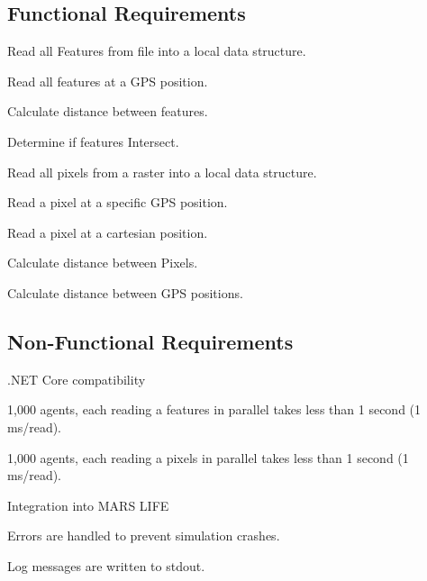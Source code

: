 \subsection{Functional Requirements}
\reqstartF
	\item Read all Features from file into a local data structure.
	\item Read all features at a GPS position.
	\item Calculate distance between features.
	\item Determine if features Intersect.
	\item Read all pixels from a raster into a local data structure.
	\item Read a pixel at a specific GPS position.
	\item Read a pixel at a cartesian position.
	\item Calculate distance between Pixels.
	\item Calculate distance between GPS positions.
\reqendF


\subsection{Non-Functional Requirements}
\reqstartNF
	\item .NET Core compatibility
	\item 1,000 agents, each reading a features in parallel takes less than 1 second (1 ms/read).
	\item 1,000 agents, each reading a pixels in parallel takes less than 1 second (1 ms/read).
	\item Integration into MARS LIFE
	\item Errors are handled to prevent simulation crashes.
	\item Log messages are written to stdout.
\reqendNF
